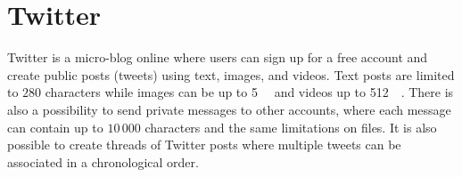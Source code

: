 \section{Twitter}
Twitter is a micro-blog online where users can sign up for a free account and create public posts (tweets) using text, images, and videos. Text posts are limited to $280$ characters while images can be up to \SI{5}{\mega\byte} and videos up to \SI{512}{\mega\byte}\cite{MediaBestPractices}. There is also a possibility to send private messages to other accounts, where each message can contain up to $10\,000$ characters and the same limitations on files. %
It is also possible to create threads of Twitter posts where multiple tweets can be associated in a chronological order.


